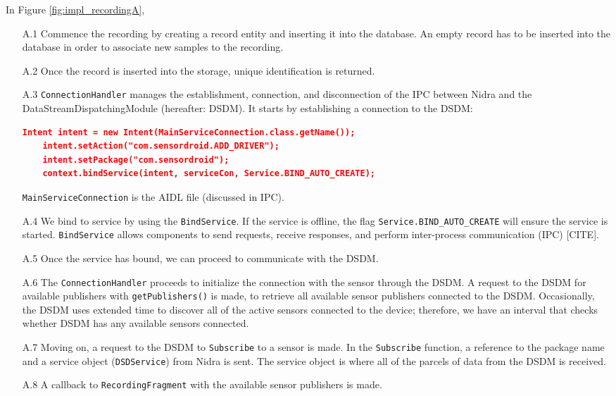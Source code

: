 In Figure \ref{fig:impl_recordingA}, 

\begin{itemize}
    \item[A.1] Commence the recording by creating a record entity and inserting it into the database. An empty record has to be inserted into the database in order to associate new samples to the recording. 
    \item[A.2] Once the record is inserted into the storage, unique identification is returned. 
    \item[A.3] \verb|ConnectionHandler| manages the establishment, connection, and disconnection of the IPC between Nidra and the DataStreamDispatchingModule (hereafter: DSDM). It starts by establishing a connection to the DSDM:
\begin{lstlisting}[language=json, caption={My Caption}, captionpos=b]
    Intent intent = new Intent(MainServiceConnection.class.getName());
    intent.setAction("com.sensordroid.ADD_DRIVER");
    intent.setPackage("com.sensordroid");
    context.bindService(intent, serviceCon, Service.BIND_AUTO_CREATE);
\end{lstlisting}
    \verb|MainServiceConnection| is the AIDL file (discussed in IPC).
    \item[A.4] We bind to service by using the \verb|BindService|. If the service is offline, the flag \verb|Service.BIND_AUTO_CREATE| will ensure the service is started. \verb|BindService| allows components to send requests, receive responses, and perform inter-process communication (IPC) [CITE]. 
    \item[A.5] Once the service has bound, we can proceed to communicate with the DSDM. 
   	\item[A.6] The \verb|ConnectionHandler| proceeds to initialize the connection with the sensor through the DSDM.  A request to the DSDM for available publishers with \verb|getPublishers()| is made, to retrieve all available sensor publishers connected to the DSDM. Occasionally, the DSDM uses extended time to discover all of the active sensors connected to the device; therefore, we have an interval that checks whether DSDM has any available sensors connected.
	\item[A.7] Moving on,  a request to the DSDM to \verb|Subscribe| to a sensor is made.  In the \verb|Subscribe| function, a reference to the package name and a service object (\verb|DSDService|) from Nidra is sent. The service object is where all of the parcels of data from the DSDM is received.   
	\item[A.8] A callback to \verb|RecordingFragment|  with the available sensor publishers is made. 

\end{itemize}
